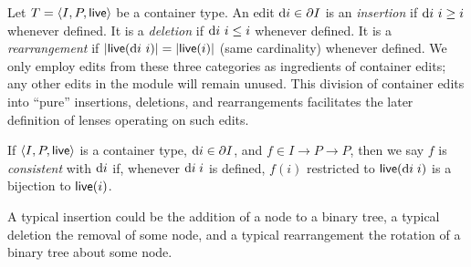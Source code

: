 \begin{defn}
  Let $T=\langle I,P,\mathsf{live}\rangle$ be a container type. An edit
  $\textrm{d} i\in\partial I$ is an \emph{insertion} if $\di\ i\geq i$ whenever
  defined. It is a \emph{deletion} if $\textrm{d} i\ i\leq i$ whenever
  defined. It is a \emph{rearrangement} if $|\mathsf{live}(\textrm{d} i\ i)|=
  |\mathsf{live}(i)|$ (same cardinality) whenever defined. We only employ
  edits from these three categories as ingredients of container edits;
  any other edits in the module will remain unused.
This division of container edits into ``pure'' insertions, deletions, and
rearrangements facilitates the later definition of lenses operating on such
edits.
\end{defn}


\begin{defn}
If $\langle I,P,\mathsf{live} \rangle$ is a container type, $\textrm{d} i \in \partial I$,
and $f \in I \to P \to P$, then we say $f$ is \emph{consistent} with $\textrm{d} i$
if, whenever $\textrm{d} i\;i$ is defined, $f(i)$ restricted to $\mathsf{live}(\textrm{d} i\;i)$ is a
bijection to $\mathsf{live}(i)$.
\end{defn}
A typical insertion could be the addition of a node to a binary tree,
a typical deletion the removal of some node, and a typical
rearrangement the rotation of a binary tree about some node.

